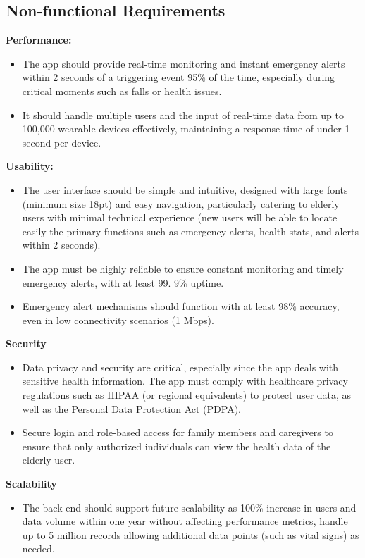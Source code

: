 \subsection{Non-functional Requirements}
\textbf{Performance:}
    \begin{itemize}
            \item The app should provide real-time monitoring and instant emergency alerts within 2 seconds of a triggering event 95\% of the time, especially during critical moments such as falls or health issues.
            \item It should handle multiple users and the input of real-time data from up to 100,000 wearable devices effectively, maintaining a response time of under 1 second per device.
    \end{itemize}
\textbf{Usability:}
    \begin{itemize}
        \item The user interface should be simple and intuitive, designed with large fonts (minimum size 18pt) and easy navigation, particularly catering to elderly users with minimal technical experience (new users will be able to locate easily the primary functions such as emergency alerts, health stats, and alerts within 2 seconds).
        \item The app must be highly reliable to ensure constant monitoring and timely emergency alerts, with at least 99. 9\% uptime.
        \item Emergency alert mechanisms should function with at least 98\% accuracy, even in low connectivity scenarios (1 Mbps). 
    \end{itemize}
\textbf{Security}
    \begin{itemize}
        \item Data privacy and security are critical, especially since the app deals with sensitive health information. The app must comply with healthcare privacy regulations such as HIPAA (or regional equivalents) to protect user data, as well as the Personal Data Protection Act (PDPA).
        \item Secure login and role-based access for family members and caregivers to ensure that only authorized individuals can view the health data of the elderly user.
    \end{itemize}
\textbf{Scalability}
    \begin{itemize}
        \item  The back-end should support future scalability as 100\% increase in users and data volume within one year without affecting performance metrics, handle up to 5 million records allowing additional data points (such as vital signs) as needed.
    \end{itemize}
